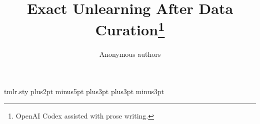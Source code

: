 \begin{filecontents*}[overwrite]{tmlr.sty}
\abovedisplayskip 7pt plus2pt minus5pt%
\belowdisplayskip \abovedisplayskip
\abovedisplayshortskip  0pt plus3pt%
\belowdisplayshortskip  4pt plus3pt minus3pt%


\def\toptitlebar{\hrule height4pt\vskip .25in\vskip-\parskip}

\def\bottomtitlebar{\vskip .29in\vskip-\parskip\hrule height1pt\vskip
.09in} %
\end{filecontents*}
\documentclass[10pt]{article}
\usepackage{tmlr}
\usepackage{amsmath,amssymb,amsthm,microtype}
\usepackage[hidelinks]{hyperref}
\usepackage{url}
\usepackage{tikz}
\usetikzlibrary{arrows.meta}
\newtheorem{theorem}{Theorem}
\newtheorem{proposition}[theorem]{Proposition}
\newtheorem{corollary}[theorem]{Corollary}
\newcommand{\R}{\mathbb R}
\newcommand{\ind}{\mathbf 1}
\newcommand{\norm}[1]{\left\lVert#1\right\rVert}
\newcommand{\minus}{\setminus}
\newcommand{\cur}{\mathcal C}
\newcommand{\bits}{\mathsf B}
\setlength{\emergencystretch}{1em}
\title{Exact Unlearning After Data Curation\thanks{OpenAI Codex assisted with prose writing.}}
\author{Anonymous authors}
\date{}

